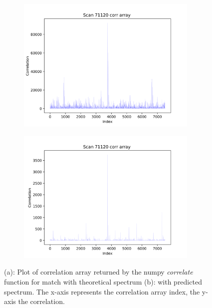 \documentclass[11pt]{article}
\begin{document}
\begin{figure}
\centering
\begin{subfigure}[b]{1\textwidth}
    \includegraphics[width=0.95\textwidth]{figs/corrtheo.png}
   \caption{}
   \label{fig:corrtheo} 
\end{subfigure}
\begin{subfigure}[b]{1\textwidth}
   \includegraphics[width=0.95\textwidth]{figs/corrpredict.png}
   \caption{}
   \label{fig:corrpredict}
\end{subfigure}
\caption{(a): Plot of correlation array returned by the numpy \textit{correlate} function for match with theoretical spectrum (b): with predicted spectrum. The x-axis represents the correlation array index, the y-axis the correlation.}
\label{predandtheocorr}
\end{figure}
\end{document}
